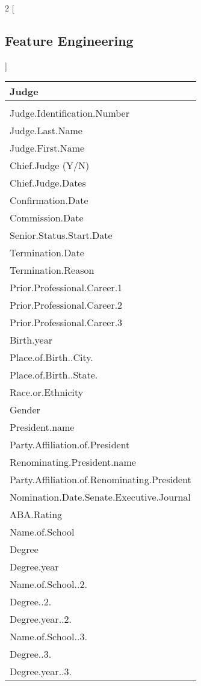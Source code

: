 \documentclass{article} %
\begin{document}
\begin{multicols}{2}
[
\subsection{Feature Engineering}
]
\vspace*{-1pt}
\begin{tabular}{l}
\bf {Judge}\\ 
\hline \\
Judge.Identification.Number\\
Judge.Last.Name\\
Judge.First.Name\\
Chief.Judge (Y/N)\\
Chief.Judge.Dates\\
Confirmation.Date\\
Commission.Date\\
Senior.Status.Start.Date\\
Termination.Date\\
Termination.Reason\\
Prior.Professional.Career.1\\
Prior.Professional.Career.2\\
Prior.Professional.Career.3\\
Birth.year\\
Place.of.Birth..City.\\
Place.of.Birth..State.\\
Race.or.Ethnicity\\
Gender\\
President.name\\
Party.Affiliation.of.President\\
Renominating.President.name\\
Party.Affiliation.of.Renominating.President\\
Nomination.Date.Senate.Executive.Journal\\
ABA.Rating\\
Name.of.School\\
Degree\\
Degree.year\\
Name.of.School..2.\\
Degree..2.\\
Degree.year..2.\\
Name.of.School..3.\\
Degree..3.\\
Degree.year..3.\\
\end{tabular}


\end{multicols}
\end{document}
